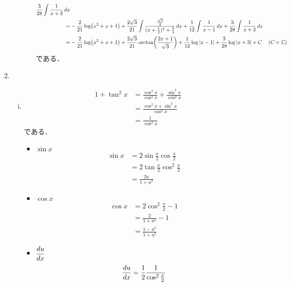 \begin{enumerate}[(1)]
\begin{enumerate}[(i)]
\begin{itemize}
\begin{align}
                \frac{3}{28}\int \frac{1}{x+3}\dd{x}\\
                =&
                -\frac{2}{21}\log(x^2+x+1)+
                \frac{2\sqrt{3}}{21}\int \frac{\frac{\sqrt{3}}{2}}{(x+\frac{1}{2})^2+\frac{3}{4}}\dd{x}+
                \frac{1}{12}\int \frac{1}{x-1}\dd{x}+
                \frac{3}{28}\int \frac{1}{x+3}\dd{x}\\
                =&
                -\frac{2}{21}\log(x^2+x+1)+
                \frac{2\sqrt{3}}{21}\arctan(\frac{2x+1}{\sqrt{3}})+
                \frac{1}{12}\log\abs{x-1}+
                \frac{3}{28}\log\abs{x+3}+C& (C\in \mathbb{C})
            \end{align}
            である．
        \end{itemize}
    \end{enumerate}
    \item 
    \begin{enumerate}[(i)]
        \item \begin{align}
            1 + \tan^2 x
            &=\frac{\cos^2x}{\cos^2x}+\frac{\sin^2x}{\cos^2x}\\
            &=\frac{\cos^2x+\sin^2x}{\cos^2x}\\
            &=\frac{1}{\cos^2x}
        \end{align}
        である．
        \begin{itemize}
            \item $\sin x$
            \begin{align}
                \sin x
                &=2\sin\frac{x}{2}\cos\frac{x}{2}\\
                &=2\tan\frac{x}{2}\cos^2\frac{x}{2}\\
                &=\frac{2u}{1+u^2}
            \end{align}
            \item $\cos x$
            \begin{align}
                \cos x
                &=2\cos^2\frac{x}{2}-1\\
                &=\frac{2}{1+u^2}-1\\
                &=\frac{1-u^2}{1+u^2}
            \end{align}
            \item $\displaystyle \dv{u}{x}$
            \begin{align}
                \dv{u}{x}
                &=\frac{1}{2}\frac{1}{\cos^2\frac{x}{2}}\\

\end{align}
\end{itemize}
\end{enumerate}
\end{enumerate}

